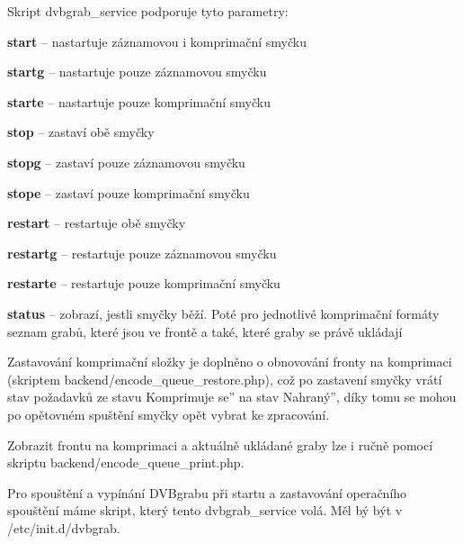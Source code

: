 Skript dvbgrab\_service podporuje tyto parametry:
\bitem
\item \textbf{start} -- nastartuje záznamovou i komprimační smyčku
\item \textbf{startg} -- nastartuje pouze záznamovou smyčku
\item\textbf{starte} -- nastartuje pouze komprimační smyčku
\item\textbf{stop} -- zastaví obě smyčky
\item\textbf{stopg} -- zastaví pouze záznamovou smyčku
\item\textbf{stope} -- zastaví pouze komprimační smyčku
\item\textbf{restart} -- restartuje obě smyčky
\item\textbf{restartg} -- restartuje pouze záznamovou smyčku
\item\textbf{restarte} -- restartuje pouze komprimační smyčku
\item\textbf{status} -- zobrazí, jestli smyčky běží. Poté pro jednotlivé komprimační formáty seznam grabů, které jsou ve frontě a také, které graby se právě ukládají
\eitem

Zastavování komprimační složky je doplněno o obnovování fronty na komprimaci (skriptem backend/encode\_queue\_restore.php), což po zastavení smyčky vrátí stav požadavků ze stavu \quotedblbase Komprimuje se'' na stav \quotedblbase Nahraný'', díky tomu se mohou po opětovném spuštění smyčky opět vybrat ke zpracování.

Zobrazit frontu na komprimaci a aktuálně ukládané graby lze i ručně pomocí skriptu \linebreak[4] backend/encode\_queue\_print.php.

Pro spouštění a vypínání DVBgrabu při startu a zastavování operačního spouštění máme skript, který tento dvbgrab\_service volá. Měl bý být v /etc/init.d/dvbgrab.
